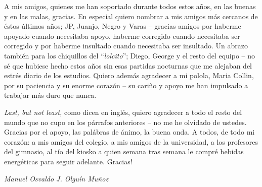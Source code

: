 \begin{thanks}
    A mis amigos, quienes me han soportado durante todos estos años, en las buenas y en las malas, gracias. 
    En especial quiero nombrar a mis amigos más cercanos de éstos últimos años; JP, Juanjo, Negro y Varas -- gracias amigos por haberme apoyado cuando necesitaba apoyo, haberme corregido cuando necesitaba ser corregido y por haberme insultado cuando necesitaba ser insultado. 
    Un abrazo también para los chiquillos del ``\emph{lolcito}''; Diego, George y el resto del equipo -- no sé que hubiese hecho estos años sin esas partidas nocturnas que me alejaban del estrés diario de los estudios. 
    Quiero además agradecer a mi polola, Maria Collin, por su paciencia y su enorme corazón -- su cariño y apoyo me han impulsado a trabajar más duro que nunca.
    
    \emph{Last, but not least,} como dicen en inglés, quiero agradecer a todo el resto del mundo que no cupo en los párrafos anteriores -- no me he olvidado de ustedes. 
    Gracias por el apoyo, las palábras de ánimo, la buena onda. 
    A todos, de todo mi corazón: a mis amigos del colegio, a mis amigos de la universidad, a los profesores del gimnasio, al tío del kiosko a quien semana tras semana le compré bebidas energéticas para seguir adelante. 
    Gracias!\\
    
    \begin{flushright}
        \textit{Manuel Osvaldo J. Olguín Muñoz}
    \end{flushright}
\end{thanks}